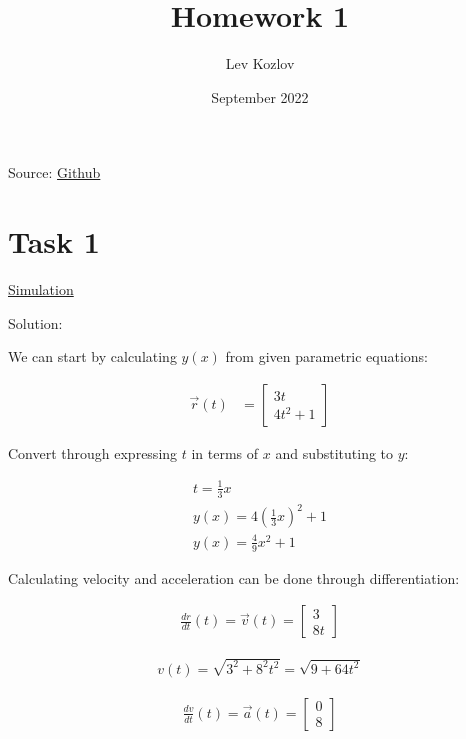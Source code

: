 \documentclass{article}
\title{Homework 1}
\author{Lev Kozlov}
\date{September 2022}
\begin{document}
\maketitle

Source: \href{https://github.com/lvjonok/f22-theoretical-mechanics/tree/master/homework1}{Github}

\section{Task 1}

\href{https://github.com/lvjonok/f22-theoretical-mechanics/blob/master/homework1/motion_task1.gif}{Simulation}

Solution:

We can start by calculating $y(x)$ from given parametric equations:


\begin{align}
    \vec{r}(t) & = \begin{bmatrix}
        3t \\
        4t^2 + 1
    \end{bmatrix}
\end{align}

Convert through expressing $t$ in terms of $x$ and substituting to $y$:

\begin{align}
    t = \frac{1}{3}x                        \\
    y(x) = 4\left(\frac{1}{3}x\right)^2 + 1 \\
    y(x) = \frac{4}{9}x^2 + 1
\end{align}

Calculating velocity and acceleration can be done through differentiation:

\begin{align}
    \frac{dr}{dt}(t) = \vec{v}(t) = \begin{bmatrix}
        3 \\
        8t
    \end{bmatrix}
\end{align}

\begin{align}
    v(t) = \sqrt{3^2 + 8^2t^2} = \sqrt{9 + 64t^2}
\end{align}

\begin{align}
    \frac{dv}{dt}(t) = \vec{a}(t) = \begin{bmatrix}
        0 \\
        8
    \end{bmatrix}
\end{align}
\end{document}
